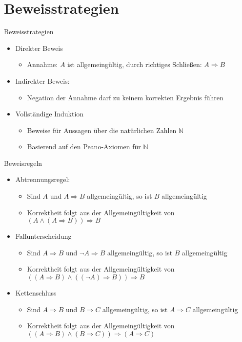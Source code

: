 \documentclass[12pt%
,aspectratio=169%
]{beamer}
\begin{document}
\section{Beweisstrategien}
\begin{frame}{Beweisstrategien}
\begin{itemize}
	\item Direkter Beweis
	\begin{itemize}
		\item Annahme: $A$ ist allgemeingültig, durch richtiges Schließen: $A \Rightarrow B$
	\end{itemize}
	\item Indirekter Beweis:
	\begin{itemize}
		\item Negation der Annahme darf zu keinem korrekten Ergebnis führen
	\end{itemize}
	\item Vollständige Induktion
	\begin{itemize}
		\item Beweise für Aussagen über die natürlichen Zahlen $\mathbb{N}$
		\item Basierend auf den Peano-Axiomen für $\mathbb{N}$
	\end{itemize}
\end{itemize}
\end{frame}

\begin{frame}{Beweisregeln}
\begin{itemize}
	\item Abtrennungsregel:
	\begin{itemize}
		\item Sind $A$ und $A \Rightarrow B$ allgemeingültig, so ist $B$ allgemeingültig
		\item Korrektheit folgt aus der Allgemeingültigkeit von $(A \land (A \Rightarrow B)) \Rightarrow B$
	\end{itemize}
	\item Fallunterscheidung
	\begin{itemize}
		\item Sind $A \Rightarrow B$ und $\neg A \Rightarrow B$ allgemeingültig, so ist $B$ allgemeingültig
		\item Korrektheit folgt aus der Allgemeingültigkeit von $((A \Rightarrow B) \land ((\neg A) \Rightarrow B)) \Rightarrow B$
	\end{itemize}
	\item Kettenschluss
	\begin{itemize}
		\item Sind $A \Rightarrow B$ und $B \Rightarrow C$ allgemeingültig, so ist $A \Rightarrow C$ allgemeingültig
		\item Korrektheit folgt aus der Allgemeingültigkeit von $((A \Rightarrow B)\land (B \Rightarrow C)) \Rightarrow (A \Rightarrow C)$
	\end{itemize}
\end{itemize}
\end{frame}
\end{document}
